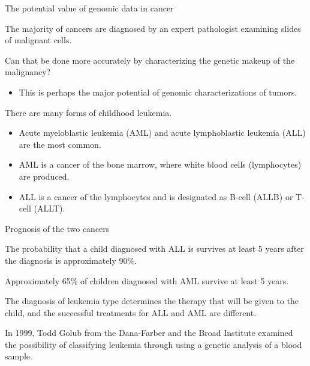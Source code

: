\documentclass[10pt]{beamer}\usepackage[]{graphicx}\usepackage[]{color}
\begin{document}
						\begin{frame}{The potential value of genomic data in cancer}
							\protect\hypertarget{the-potential-value-of-genomic-data-in-cancer}{}
							
							The majority of cancers are diagnosed by an expert pathologist examining
							slides of malignant cells.
							
							Can that be done more accurately by characterizing the genetic makeup of
							the malignancy?
							
							\begin{itemize}
								\tightlist
								\item
								This is perhaps the major potential of genomic characterizations of
								tumors.
							\end{itemize}
							
							There are many forms of childhood leukemia.
							
							\begin{itemize}
								\item
								Acute myeloblastic leukemia (AML) and acute lymphoblastic leukemia
								(ALL) are the most common.
								\item
								AML is a cancer of the bone marrow, where white blood cells
								(lymphocytes) are produced.
								\item
								ALL is a cancer of the lymphocytes and is designated as B-cell (ALLB)
								or T-cell (ALLT).
							\end{itemize}
							
						\end{frame}
						
						\begin{frame}{Prognosis of the two cancers}
							\protect\hypertarget{prognosis-of-the-two-cancers}{}
							
							The probability that a child diagnosed with ALL is survives at least 5
							years after the diagnosis is approximately 90\%.
							
							Approximately 65\% of children diagnosed with AML survive at least 5
							years.
							
							The diagnosis of leukemia type determines the therapy that will be given
							to the child, and the successful treatments for ALL and AML are
							different.
							
							In 1999, Todd Golub from the Dana-Farber and the Broad Institute
							examined the possibility of classifying leukemia through using a genetic
							analysis of a blood sample.
							
						\end{frame}
						
\end{document}

